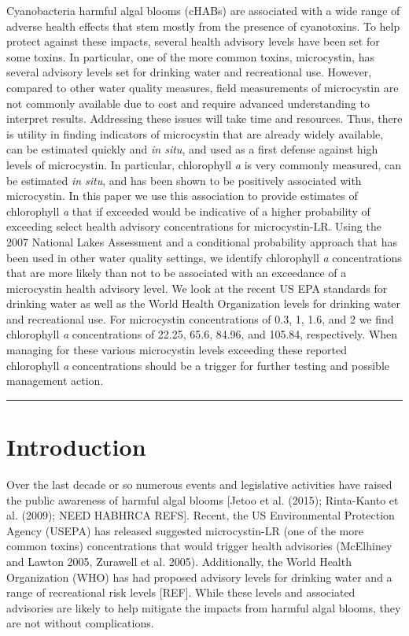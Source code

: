 \documentclass[11pt,]{article}
\begin{document}
Cyanobacteria harmful algal blooms (cHABs) are associated with a wide
range of adverse health effects that stem mostly from the presence of
cyanotoxins. To help protect against these impacts, several health
advisory levels have been set for some toxins. In particular, one of the
more common toxins, microcystin, has several advisory levels set for
drinking water and recreational use. However, compared to other water
quality measures, field measurements of microcystin are not commonly
available due to cost and require advanced understanding to interpret
results. Addressing these issues will take time and resources. Thus,
there is utility in finding indicators of microcystin that are already
widely available, can be estimated quickly and \emph{in situ}, and used
as a first defense against high levels of microcystin. In particular,
chlorophyll \emph{a} is very commonly measured, can be estimated
\emph{in situ}, and has been shown to be positively associated with
microcystin. In this paper we use this association to provide estimates
of chlorophyll \emph{a} that if exceeded would be indicative of a higher
probability of exceeding select health advisory concentrations for
microcystin-LR. Using the 2007 National Lakes Assessment and a
conditional probability approach that has been used in other water
quality settings, we identify chlorophyll \emph{a} concentrations that
are more likely than not to be associated with an exceedance of a
microcystin health advisory level. We look at the recent US EPA
standards for drinking water as well as the World Health Organization
levels for drinking water and recreational use. For microcystin
concentrations of 0.3, 1, 1.6, and 2 we find chlorophyll \emph{a}
concentrations of 22.25, 65.6, 84.96, and 105.84, respectively. When
managing for these various microcystin levels exceeding these reported
chlorophyll \emph{a} concentrations should be a trigger for further
testing and possible management action.

\vspace{3mm}

\hrule

\doublespace

\section{Introduction}\label{introduction}

Over the last decade or so numerous events and legislative activities
have raised the public awareness of harmful algal blooms {[}Jetoo et al.
(2015); Rinta-Kanto et al. (2009); NEED HABHRCA REFS{]}. Recent, the US
Environmental Protection Agency (USEPA) has released suggested
microcystin-LR (one of the more common toxins) concentrations that would
trigger health advisories (McElhiney and Lawton 2005, Zurawell et al.
2005). Additionally, the World Health Organization (WHO) has had
proposed advisory levels for drinking water and a range of recreational
risk levels {[}REF{]}. While these levels and associated advisories are
likely to help mitigate the impacts from harmful algal blooms, they are
not without complications.
\end{document}
